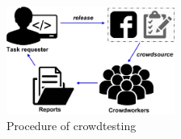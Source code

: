 \begin{figure}[t!]
\centering
\vspace{0.1in}
\includegraphics[width=5.5cm]{figure/process.png}
\caption{Procedure of crowdtesting \cite{feng2015test}}
\label{fig:process}
\end{figure}

